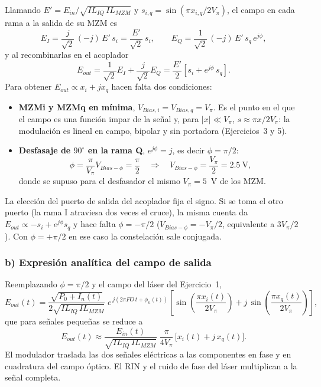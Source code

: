 Llamando $E' = E_{in}/\sqrt{IL_{IQ}\,IL_{MZM}}$ y
$s_{i,q} = \sin(\pi x_{i,q}/2V_\pi)$, el campo en cada rama a la salida
de su MZM es
%
\begin{equation}
E_I = \frac{j}{\sqrt{2}}\,(-j)\,E'\,s_i = \frac{E'}{\sqrt{2}}\,s_i,
\qquad
E_Q = \frac{1}{\sqrt{2}}\,(-j)\,E'\,s_q\,e^{j\phi},
\end{equation}
%
y al recombinarlas en el acoplador
%
\begin{equation}
E_{out} = \frac{1}{\sqrt{2}}E_I + \frac{j}{\sqrt{2}}E_Q
= \frac{E'}{2}\left[s_i + e^{j\phi}\,s_q\right].
\end{equation}
%
Para obtener $E_{out} \propto x_i + jx_q$ hacen falta dos condiciones:
%
\begin{itemize}\itemsep2pt
\item \textbf{MZMi y MZMq en mínima}, $V_{Bias,i} = V_{Bias,q} = V_\pi$.
      Es el punto en el que el campo es una función impar de la señal y,
      para $|x| \ll V_\pi$, $s \approx \pi x/2V_\pi$: la modulación es
      lineal en campo, bipolar y sin portadora (Ejercicios~3 y 5).
\item \textbf{Desfasaje de $90^\circ$ en la rama Q}, $e^{j\phi} = j$, es
      decir $\phi = \pi/2$:
      \begin{equation}
      \phi = \frac{\pi}{V_\pi}V_{Bias-\phi} = \frac{\pi}{2}
      \quad\Longrightarrow\quad
      V_{Bias-\phi} = \frac{V_\pi}{2} = 2.5~\text{V},
      \end{equation}
      donde se supuso para el desfasador el mismo $V_\pi = 5$~V de los MZM.
\end{itemize}
%
La elección del puerto de salida del acoplador fija el signo. Si se toma
el otro puerto (la rama I atraviesa dos veces el cruce), la misma cuenta
da $E_{out} \propto -s_i + e^{j\phi}s_q$ y hace falta $\phi = -\pi/2$
($V_{Bias-\phi} = -V_\pi/2$, equivalente a $3V_\pi/2$). Con
$\phi = +\pi/2$ en ese caso la constelación sale conjugada.

\subsubsection*{b) Expresión analítica del campo de salida}

Reemplazando $\phi = \pi/2$ y el campo del láser del Ejercicio~1,
%
\begin{equation}
E_{out}(t) = \frac{\sqrt{P_0 + I_n(t)}}{2\sqrt{IL_{IQ}\,IL_{MZM}}}\;
e^{\,j(2\pi FO\,t + \phi_n(t))}
\left[\sin\!\left(\frac{\pi x_i(t)}{2V_\pi}\right)
+ j\,\sin\!\left(\frac{\pi x_q(t)}{2V_\pi}\right)\right],
\label{eq:ej8_eout}
\end{equation}
%
que para señales pequeñas se reduce a
%
\begin{equation}
E_{out}(t) \approx \frac{E_{in}(t)}{\sqrt{IL_{IQ}\,IL_{MZM}}}\;
\frac{\pi}{4V_\pi}\,\big[x_i(t) + j\,x_q(t)\big].
\end{equation}
%
El modulador traslada las dos señales eléctricas a las componentes en
fase y en cuadratura del campo óptico. El RIN y el ruido de fase del láser
multiplican a la señal completa.

